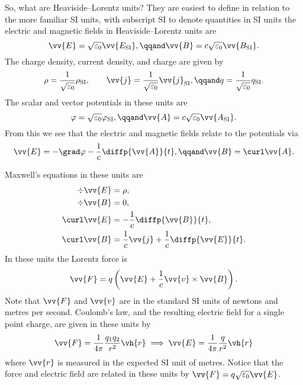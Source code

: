 \documentclass[fleqn]{NotesClass}
\newcommand*{\SIunits}{\mathrm{SI}}
\begin{document}
    So, what are Heaviside--Lorentz units?
    They are easiest to define in relation to the more familiar SI units, with subscript \(\SIunits\) to denote quantities in SI units the electric and magnetic fields in Heaviside--Lorentz units are
    \begin{equation}
        \vv{E} = \sqrt{\varepsilon_0}\vv{E_{\SIunits}}, \qqand \vv{B} = c\sqrt{\varepsilon_0}\vv{B_{\SIunits}}.
    \end{equation}
    The charge density, current density, and charge are given by
    \begin{equation}
        \rho = \frac{1}{\sqrt{\varepsilon_0}}\rho_{\SIunits}, \qquad \vv{j} = \frac{1}{\sqrt{\varepsilon_0}}\vv{j}_{\SIunits}, \qqand q = \frac{1}{\sqrt{\varepsilon_0}}q_{\SIunits}.
    \end{equation}
    The scalar and vector potentials in these units are
    \begin{equation}
        \varphi = \sqrt{\varepsilon_0}\varphi_{\SIunits}, \qqand \vv{A} = c\sqrt{\varepsilon_0}\vv{A_{\SIunits}}.
    \end{equation}
    From this we see that the electric and magnetic fields relate to the potentials via
    \begin{equation}
        \vv{E} = -\grad\varphi - \frac{1}{c}\diffp{\vv{A}}{t}, \qqand \vv{B} = \curl \vv{A}.
    \end{equation}
    
    Maxwell's equations in these units are
    \begin{align}
        \div \vv{E} &= \rho,\\
        \div \vv{B} &= 0,\\
        \curl\vv{E} &= -\frac{1}{c}\diffp{\vv{B}}{t},\\
        \curl\vv{B} &= \frac{1}{c}\vv{j} + \frac{1}{c}\diffp{\vv{E}}{t}.
    \end{align}
    In these units the Lorentz force is
    \begin{equation}
        \vv{F} = q\left( \vv{E} + \frac{1}{c}\vv{v} \times \vv{B} \right).
    \end{equation}
    Note that \(\vv{F}\) and \(\vv{v}\) are in the standard SI units of newtons and metres per second.
    Coulomb's law, and the resulting electric field for a single point charge, are given in these units by
    \begin{equation}
        \vv{F} = \frac{1}{4\pi} \frac{q_1q_2}{r^2}\vh{r} \implies \vv{E} = \frac{1}{4\pi}\frac{q}{r^2}\vh{r}
    \end{equation}
    where \(\vv{r}\) is measured in the expected SI unit of metres.
    Notice that the force and electric field are related in these units by \(\vv{F} = q\sqrt{\varepsilon_0}\vv{E}\).
    
\end{document}
